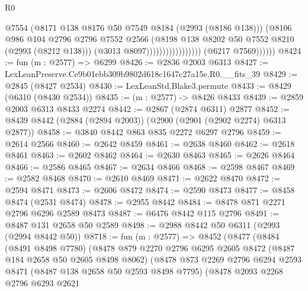 \begin{lexlean}{R0}
\begin{coremodule}
                                            @7554
                                            (@8171 @138 @8176 @50 @7549 @8184 (@2993 (@8186 @138)))
                                            (@8106
                                              @986
                                              @104
                                              @2796
                                              @2796
                                              @7552
                                              @2566
                                              (@8198
                                                @138
                                                @8202
                                                @50
                                                @7552
                                                @8210
                                                (@2993 (@8212 @138)))
                                              (@3013 @8097)))))))))))))))))
              (@6217 @7569))))))
@8424 := fun (m : @2577) => @6299
@8426 := @2836 @2003 @6313
@8427 := LexLeanPreserve.Ce9b01ebb309b9802d618c1647c27a15e.R0.__fits_39
@8429 := @2845 (@8427 @2534)
@8430 := LexLeanStd.Blake3.permute
@8433 := @8429 (@6310 (@8430 @2534))
@8435 := (m : @2577) -> @8426 @8433
@8439 := @2859 @2003 @6313 @8433 @2274
@8442 := @2867 (@2874 @6311) @2877
@8452 := @8439 @8442 (@2884 (@2894 @2003)) (@2900 (@2901 (@2902 @2274) @6313 @2877))
@8458 := @3840 @8442 @863 @835 @2272 @6297 @2796
@8459 := @2614 @2566
@8460 := @2642 @8459
@8461 := @2638 @8460
@8462 := @2618 @8461
@8463 := @2602 @8462
@8464 := @2630 @8463
@8465 := @2626 @8464
@8466 := @2586 @8465
@8467 := @2634 @8466
@8468 := @2598 @8467
@8469 := @2582 @8468
@8470 := @2610 @8469
@8471 := @2622 @8470
@8472 := @2594 @8471
@8473 := @2606 @8472
@8474 := @2590 @8473
@8477 := @8458 @8474 (@2531 @8474)
@8478 := @2955 @8442
@8484 := @8478 @871 @2271 @2796 @6296 @2589 @8473
@8487 := @6476 @8442 @115 @2796
@8491 := @8487 @131 @2658 @50 @2589
@8498 := @2988 @8442 @50 @6311 (@2993 (@2994 @8442 @50))
@8718 := fun (m : @2577) =>
  @8452
    (@8477
      (@8484
        (@8491 @8498 @7780)
        (@8478
          @879
          @2270
          @2796
          @6295
          @2605
          @8472
          (@8487 @184 @2658 @50 @2605 @8498 @8062)
          (@8478
            @873
            @2269
            @2796
            @6294
            @2593
            @8471
            (@8487 @138 @2658 @50 @2593 @8498 @7795)
            (@8478
              @2093
              @2268
              @2796
              @6293
              @2621

\end{coremodule}
\end{lexlean}

